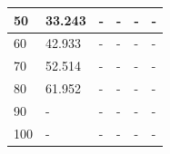 \begin{table}[htp]
\begin{tabular}{|l|l|l|l|l|l|}
50                               & 33.243          & -                & -                & -                & -                \\ \hline
60                               & 42.933          & -                & -                & -                & -                \\ \hline
70                               & 52.514          & -                & -                & -                & -                \\ \hline
80                               & 61.952          & -                & -                & -                & -                \\ \hline
90                               & -               & -                & -                & -                & -                \\ \hline
100                              & -               & -                & -                & -                & -                \\ \hline
\end{tabular}
\end{table}

